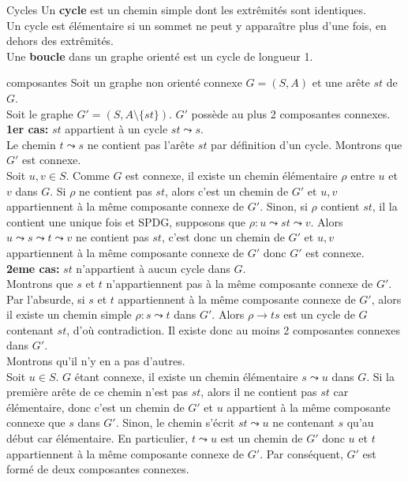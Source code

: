 \documentclass[french, 11pt]{article}
\begin{document}
\vspace*{-0.7cm}

\begin{defi}{Cycles}{}
    Un \textbf{cycle} est un chemin simple dont les extrêmités sont identiques.\\
    Un cycle est élémentaire si un sommet ne peut y apparaître plus d'une fois, en dehors des extrêmités.\\
    Une \textbf{boucle} dans un graphe orienté est un cycle de longueur 1.
\end{defi}

\begin{lemme}{}{composantes}
    Soit un graphe non orienté connexe $G=(S,A)$ et une arête $st$ de $G$.\\
    Soit le graphe $G'=(S,A\setminus\{st\})$. $G'$ possède au plus 2 composantes connexes.
    \tcblower
    \textbf{1er cas:} $st$ appartient à un cycle $st\leadsto s$.\\
    Le chemin $t\leadsto s$ ne contient pas l'arête $st$ par définition d'un cycle. Montrons que $G'$ est connexe.\\
    Soit $u,v\in S$. Comme $G$ est connexe, il existe un chemin élémentaire $\rho$ entre $u$ et $v$ dans $G$. Si $\rho$ ne contient pas $st$, alors c'est un chemin de $G'$ et $u,v$ appartiennent à la même composante connexe de $G'$. Sinon, si $\rho$ contient $st$, il la contient une unique fois et SPDG, supposons que $\rho:u\leadsto st \leadsto v$. Alors $u\leadsto s \leadsto t \leadsto v$ ne contient pas $st$, c'est donc un chemin de $G'$ et $u,v$ appartiennent à la même composante connexe de $G'$ donc $G'$ est connexe.\\
    \textbf{2eme cas:} $st$ n'appartient à aucun cycle dans $G$.\\
    Montrons que $s$ et $t$ n'appartiennent pas à la même composante connexe de $G'$.\\
    Par l'absurde, si $s$ et $t$ appartiennent à la même composante connexe de $G'$, alors il existe un chemin simple $\rho:s\leadsto t$ dans $G'$. Alors $\rho\to ts$ est un cycle de $G$ contenant $st$, d'où contradiction. Il existe donc au moins 2 composantes connexes dans $G'$.\\
    Montrons qu'il n'y en a pas d'autres.\\
    Soit $u\in S$. $G$ étant connexe, il existe un chemin élémentaire $s\leadsto u$ dans $G$. Si la première arête de ce chemin n'est pas $st$, alors il ne contient pas $st$ car élémentaire, donc c'est un chemin de $G'$ et $u$ appartient à la même composante connexe que $s$ dans $G'$. Sinon, le chemin s'écrit $st\leadsto u$ ne contenant $s$ qu'au début car élémentaire. En particulier, $t\leadsto u$ est un chemin de $G'$ donc $u$ et $t$ appartiennent à la même composante connexe de $G'$. Par conséquent, $G'$ est formé de deux composantes connexes. 
\end{lemme}
\end{document}
